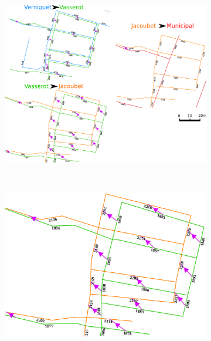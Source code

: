 \documentclass[a4paper,12pt]{article}
\begin{document}
\begin{figure}
\centering

        \begin{subfigure}[b]{0.5\textheight}
                \includegraphics[width=\textwidth]{./images/illus_graphs/graphe_1_1_greneta.png}
				\caption{}
                \label{fig:test}
        \end{subfigure}%
        \\
                \begin{subfigure}[b]{0.5\textheight}
                \includegraphics[width=\textwidth]{./images/illus_graphs/graphe_1_1_greneta_2.png}
				\caption{}
                \label{fig:test}
        \end{subfigure}%
        \end{figure}
\end{document}
